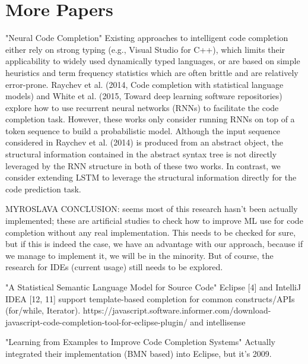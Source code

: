 \section{More Papers}
"Neural Code Completion"
Existing approaches to intelligent code completion either rely on strong typing (e.g., Visual Studio for C++), which limits their applicability to widely used dynamically typed languages, or are based on simple heuristics and term frequency statistics which are often brittle and are relatively error-prone. Raychev et al. (2014, Code completion with statistical language models) and White et al. (2015, Toward deep learning software repositories) explore how to use recurrent neural networks (RNNs) to facilitate the code completion task. However, these works only consider running RNNs on top of a token sequence to build a probabilistic model. Although the input sequence considered in Raychev et al. (2014) is produced from an abstract object, the structural information contained in the abstract syntax tree is not directly leveraged by the RNN structure in both of these two works. In contrast, we consider extending LSTM to leverage the structural information directly for the code prediction task.

MYROSLAVA CONCLUSION: seems most of this research hasn't been actually implemented; these are artificial studies to check how to improve ML use for code completion without any real implementation. This needs to be checked for sure, but if this is indeed the case, we have an advantage with our approach, because if we manage to implement it, we will be in the minority. But of course, the research for IDEs (current usage) still needs to be explored.

"A Statistical Semantic Language Model for Source Code"
Eclipse [4] and IntelliJ IDEA [12, 11] support template-based completion for common constructs/APIs (for/while, Iterator).
https://javascript.software.informer.com/download-javascript-code-completion-tool-for-eclipse-plugin/
and intellisense

"Learning from Examples to Improve Code Completion Systems"
Actually integrated their implementation (BMN based) into Eclipse, but it's 2009.